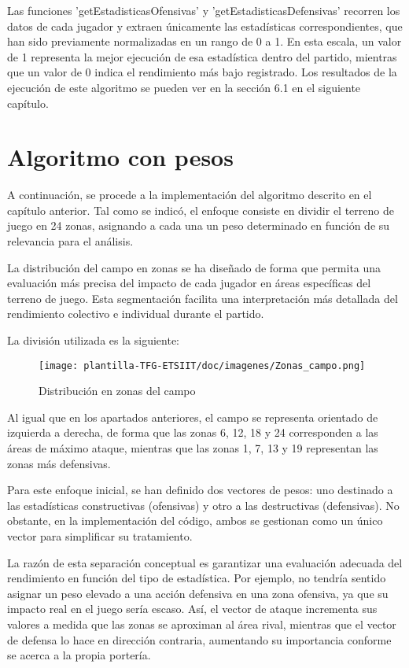 Las funciones 'getEstadisticasOfensivas' y 'getEstadisticasDefensivas' recorren los datos de cada jugador y extraen únicamente las estadísticas correspondientes, que han sido previamente normalizadas en un rango de 0 a 1. En esta escala, un valor de 1 representa la mejor ejecución de esa estadística dentro del partido, mientras que un valor de 0 indica el rendimiento más bajo registrado.
Los resultados de la ejecución de este algoritmo se pueden ver en la sección 6.1 en el siguiente capítulo.

\section{Algoritmo con pesos}
A continuación, se procede a la implementación del algoritmo descrito en el capítulo anterior. Tal como se indicó, el enfoque consiste en dividir el terreno de juego en 24 zonas, asignando a cada una un peso determinado en función de su relevancia para el análisis.

La distribución del campo en zonas se ha diseñado de forma que permita una evaluación más precisa del impacto de cada jugador en áreas específicas del terreno de juego. Esta segmentación facilita una interpretación más detallada del rendimiento colectivo e individual durante el partido.

La división utilizada es la siguiente:

\begin{figure}[H]
    \centering
    \texttt{[image: plantilla-TFG-ETSIIT/doc/imagenes/Zonas\_campo.png]}
    \caption{Distribución en zonas del campo}
    \label{fig:etiqueta-imagen}
\end{figure}

Al igual que en los apartados anteriores, el campo se representa orientado de izquierda a derecha, de forma que las zonas 6, 12, 18 y 24 corresponden a las áreas de máximo ataque, mientras que las zonas 1, 7, 13 y 19 representan las zonas más defensivas.

Para este enfoque inicial, se han definido dos vectores de pesos: uno destinado a las estadísticas constructivas (ofensivas) y otro a las destructivas (defensivas). No obstante, en la implementación del código, ambos se gestionan como un único vector para simplificar su tratamiento.

La razón de esta separación conceptual es garantizar una evaluación adecuada del rendimiento en función del tipo de estadística. Por ejemplo, no tendría sentido asignar un peso elevado a una acción defensiva en una zona ofensiva, ya que su impacto real en el juego sería escaso. Así, el vector de ataque incrementa sus valores a medida que las zonas se aproximan al área rival, mientras que el vector de defensa lo hace en dirección contraria, aumentando su importancia conforme se acerca a la propia portería.

